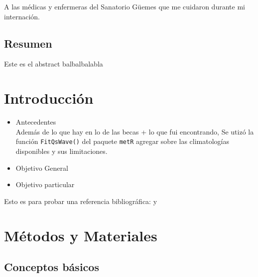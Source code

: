 \documentclass[spanish,a4paper,12pt,oneside]{book}
\providecommand{\tightlist}{%
  \setlength{\itemsep}{0pt}\setlength{\parskip}{0pt}}
\begin{document}
A las médicas y enfermeras del Sanatorio Güemes que me cuidaron durante
mi internación.

\newpage

\begin{center}\begin{minipage}{\dimexpr\paperwidth-7cm}
\chapter*{Resumen}
Este es el abstract balbalbalabla
\end{minipage}
\end{center}

\setcounter{tocdepth}{3} \tableofcontents

\listoffigures
\newpage

\mainmatter

\chapter{Introducción}\label{introduccion}

\citet{Wheeler2004}

\citet{James}

\citet{Loon1972}

\cite{Loon1972}

\cite{James}

\citep{James, R-metR}

\begin{itemize}
\tightlist
\item
  Antecedentes\\
  Además de lo que hay en lo de las becas + lo que fui encontrando, Se
  utizó la función \texttt{FitQsWave()} del paquete \texttt{metR}
  \citep{R-metR} agregar sobre las climatologías disponibles y sus
  limitaciones.
\item
  Objetivo General
\item
  Objetivo particular
\end{itemize}

Esto es para probar una referencia bibliográfica: \citet{Vera2004} y
\citep{Vera2004}

\chapter{Métodos y Materiales}\label{metodos-y-materiales}


\section{Conceptos básicos}\label{conceptos-basicos}
\end{document}
